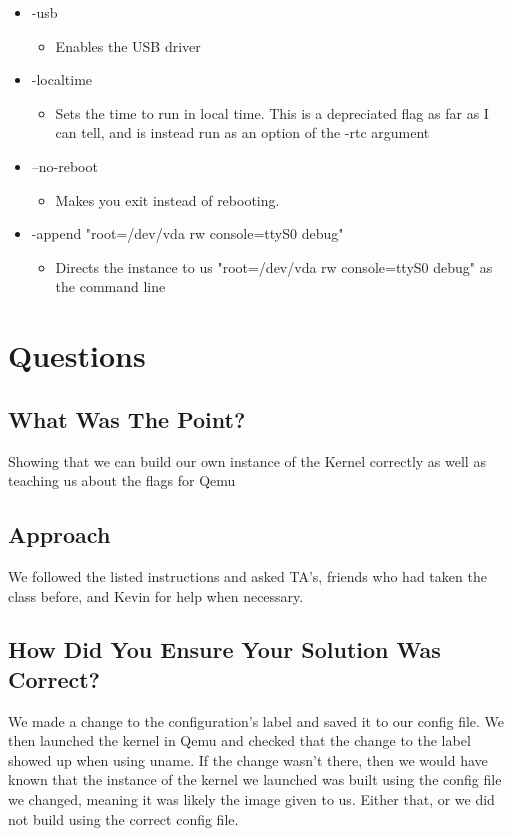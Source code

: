 \documentclass[onecolumn, draftclsnofoot,10pt, compsoc]{IEEEtran}
\begin{document}
\begin{itemize}
\begin{itemize}
            \end{itemize}
        \item -usb
            \begin{itemize}
                \item Enables the USB driver
            \end{itemize}
        \item -localtime
            \begin{itemize}
                \item Sets the time to run in local time. This is a depreciated flag as far as I can tell, and is instead run as an option of the -rtc argument
            \end{itemize}
        \item --no-reboot
            \begin{itemize}
                \item Makes you exit instead of rebooting.
            \end{itemize}
        \item -append "root=/dev/vda rw console=ttyS0 debug"
            \begin{itemize}
                \item Directs the instance to us "root=/dev/vda rw console=ttyS0 debug" as the command line
            \end{itemize}
    \end{itemize}


\section{Questions}
    \subsection{What Was The Point?}
    Showing that we can build our own instance of the Kernel correctly as well as teaching us about the flags for Qemu
    \subsection{Approach}
    We followed the listed instructions and asked TA's, friends who had taken the class before, and Kevin for help when necessary.
    \subsection{How Did You Ensure Your Solution Was Correct?}
    We made a change to the configuration's label and saved it to our config file. We then launched the kernel in Qemu and checked that the change to the label showed up when using uname. If the change wasn't there, then we would have known that the instance of the kernel we launched was built using the config file we changed, meaning it was likely the image given to us. Either that, or we did not build using the correct config file.
\end{document}
